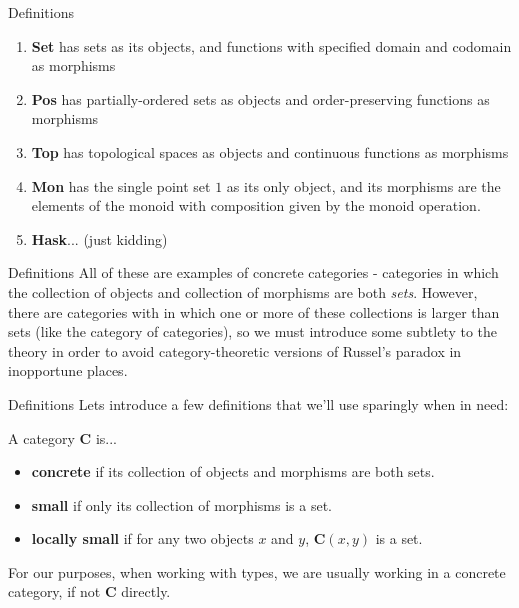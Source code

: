 \documentclass[tikz]{beamer}
\theoremstyle{definition}
\begin{document}
\begin{frame}{Definitions}
\begin{enumerate}[i]
    \item \textbf{Set} has sets as its objects, and functions with specified domain and codomain as morphisms
    \item \textbf{Pos} has partially-ordered sets as objects and order-preserving functions as morphisms
    \item \textbf{Top} has topological spaces as objects and continuous functions as morphisms
    \item \textbf{Mon} has the single point set $1$ as its only object, and its morphisms are the elements of the monoid with composition given by the monoid operation.
    \item \textbf{Hask}... (just kidding)
\end{enumerate}{}
\end{frame}
\begin{frame}{Definitions}
    All of these are examples of concrete categories - categories in which the collection of objects and collection of morphisms are both \textit{sets}. However, there are categories with in which one or more of these collections is larger than sets (like the category of categories), so we must introduce some subtlety to the theory in order to avoid category-theoretic versions of Russel's paradox in inopportune places.
\end{frame}{}
\begin{frame}{Definitions}
    Lets introduce a few definitions that we'll use sparingly when in need:

\begin{definition}

A category $\mathbf{C}$ is...
\begin{itemize}
    \item \textbf{concrete} if its collection of objects and morphisms are both sets.
    \item  \textbf{small} if only its collection of morphisms is a set.
    \item \textbf{locally small} if for any two objects $x$ and $y$, $\mathbf{C}(x, y)$  is a set.
\end{itemize}{}
\end{definition}

For our purposes, when working with types, we are usually working in a concrete category, if not $\mathbf{C}$ directly.
\end{frame}
\end{document}

